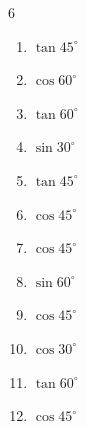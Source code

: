 \begin{multicols}{6}
\begin{enumerate}
  \item $\displaystyle \tan{45^\circ}$

        \phantom{$\displaystyle =1$}

  \item $\displaystyle \cos{60^\circ}$


  \item $\displaystyle \tan{60^\circ}$


  \item $\displaystyle \sin{30^\circ}$


  \item $\displaystyle \tan{45^\circ}$

        \phantom{$\displaystyle =1$}

  \item $\displaystyle \cos{45^\circ}$


  \item $\displaystyle \cos{45^\circ}$


  \item $\displaystyle \sin{60^\circ}$


  \item $\displaystyle \cos{45^\circ}$


  \item $\displaystyle \cos{30^\circ}$


\columnbreak %

\resetques

  \item $\displaystyle \tan{60^\circ}$


  \item $\displaystyle \cos{45^\circ}$



\end{enumerate}
\end{multicols}
